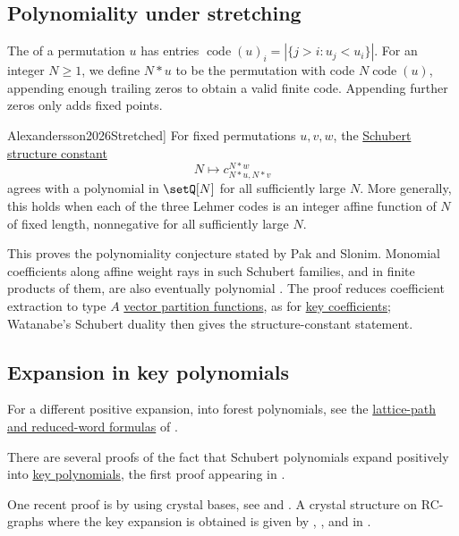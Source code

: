 \subsection[schubertStretching]{Polynomiality under stretching}

The  of a permutation $u$ has entries
$\operatorname{code}(u)_i=|\{j>i:u_j<u_i\}|$.
For an integer $N\geq1$, we define $N*u$ to be the permutation
with code $N\operatorname{code}(u)$,
appending enough trailing zeros to obtain a valid finite code.
Appending further zeros only adds fixed points.

\begin{theorem}[Alexandersson, \cite[Thm.~7.2 and Cor.~7.3]{Alexandersson2026Stretched}]
For fixed permutations $u,v,w$, the
\hyperref[schubertLittlewoodRichardson]{Schubert structure constant}
\[
 N\longmapsto c^{N*w}_{N*u,N*v}
\]
agrees with a polynomial in $\setQ[N]$ for all sufficiently large $N$.
More generally, this holds when each of the three Lehmer codes is an
integer affine function of $N$ of fixed length, nonnegative for all
sufficiently large $N$.
\end{theorem}

This proves the polynomiality conjecture stated by Pak and Slonim.
Monomial coefficients along affine weight rays in such Schubert families,
and in finite products of them, are also eventually polynomial
\cite[Cor.~6.4 and Prop.~7.1]{Alexandersson2026Stretched}.
The proof reduces coefficient extraction to type $A$
\hyperref[kostantPartitionFunction]{vector partition functions},
as for \hyperref[keyStretchedCoefficients]{key coefficients};
Watanabe's Schubert duality then gives the structure-constant statement.

\subsection[schubertKeyExpansion]{Expansion in key polynomials}

For a different positive expansion, into forest polynomials, see the
\hyperref[equivariantQuasisymmetry]{lattice-path and reduced-word formulas}
of  \cite[Thm.~51]{Lee2026ForestPaths}.

There are several proofs of the fact that Schubert polynomials expand positively into \hyperref[key]{key polynomials},
the first proof appearing in \cite{LascouxSchutzenberger1990}.

One recent proof is by using crystal bases, see  and  \cite{AssafSchilling2018}.
A crystal structure on RC-graphs where the key expansion is obtained is given
by , , and  in \cite{GoldMilicevicSun2024x}.

